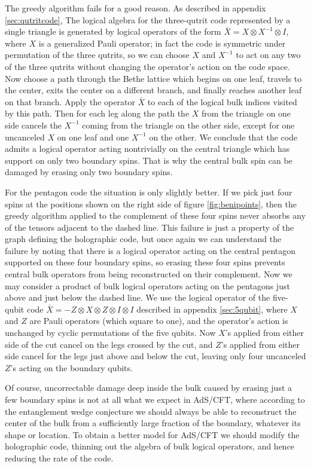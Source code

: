 \documentclass[12pt]{article}
\theoremstyle{plain}
\theoremstyle{plain}
\theoremstyle{plain}
\theoremstyle{plain}
\theoremstyle{result}
\theoremstyle{remark}
\theoremstyle{conjecture}
\theoremstyle{observation}
\theoremstyle{definition}
\theoremstyle{corollary}
\theoremstyle{definition}
\theoremstyle{definition}
\theoremstyle{assumption}
\theoremstyle{definition}
\theoremstyle{problem}
\theoremstyle{fact}
\begin{document}
The greedy algorithm fails for a good reason. 
As described in appendix \ref{sec:qutritcode}, The logical algebra for the three-qutrit code represented by a single triangle is generated by logical operators of the form $\bar X =X\otimes X^{-1} \otimes I$, where $X$ is a generalized Pauli operator; 
in fact the code is symmetric under permutation of the three qutrits, so we can choose $X$ and $X^{-1}$ to act on any two of the three qutrits without changing the operator's action on the code space. 
Now choose a path through the Bethe lattice which begins on one leaf, travels to the center, exits the center on a different branch, and finally reaches another leaf on that branch. 
Apply the operator $\bar X$ to each of the logical bulk indices visited by this path. 
Then for each leg along the path the $X$ from the triangle on one side cancels the $X^{-1}$ coming from the triangle on the other side, except for one uncanceled $X$ on one leaf and one $X^{-1}$ on the other. 
We conclude that the code admits a logical operator acting nontrivially on the central triangle which has support on only two boundary spins. 
That is why the central bulk spin can be damaged by erasing only two boundary spins. 

For the pentagon code the situation is only slightly better. 
If we pick just four spins at the positions shown on the right side of figure \ref{fig:benipoints}, then the greedy algorithm applied to the complement of these four spins never absorbs any of the tensors adjacent to the dashed line. 
This failure is just a property of the graph defining the holographic code, but once again we can understand the failure by noting that there is a logical operator acting on the central pentagon supported on these four boundary spins, so erasing these four spins prevents central bulk operators from being reconstructed on their complement. Now we may consider a product of bulk logical operators acting on the pentagons just above and just below the dashed line. 
We use the logical operator of the five-qubit code $\bar X = - Z\otimes X\otimes Z\otimes I\otimes I$ described in appendix \ref{sec:5qubit}, where $X$ and $Z$ are Pauli operators (which square to one), and the operator's action is unchanged by cyclic permutations of the five qubits.
Now $X$'s applied from either side of the cut cancel on the legs crossed by the cut, and $Z$'s applied from either side cancel for the legs just above and below the cut, leaving only four uncanceled $Z$'s acting on the boundary qubits. 

Of course, uncorrectable damage deep inside the bulk caused by erasing just a few boundary spins is not at all what we expect in AdS/CFT, where according to the entanglement wedge conjecture we should always be able to reconstruct the center of the bulk from a sufficiently large fraction of the boundary, whatever its shape or location. To obtain a better model for AdS/CFT we should modify the holographic code, thinning out the algebra of bulk logical operators, and hence reducing the rate of the code. 
\end{document}
